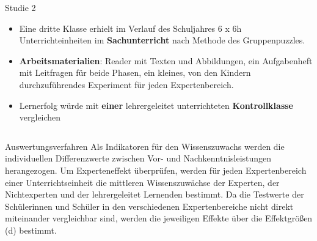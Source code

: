 \documentclass[final]{beamer}
\newlength{\onecolwid}
\newlength{\twocolwid}
\begin{document}
\begin{frame}[t]
\begin{columns}[t]
\begin{column}{\twocolwid}
\begin{columns}[t,totalwidth=\twocolwid]
\begin{column}{\onecolwid}\vspace{-.6in} %
\begin{block}{Studie 2}
\begin{itemize}
\justifying
\item Eine dritte Klasse erhielt im Verlauf des Schuljahres 6 x 6h Unterrichteinheiten im \textbf{Sachunterricht} nach Methode des Gruppenpuzzles. 
\item \textbf{Arbeitsmaterialien}: Reader mit Texten und Abbildungen, ein Aufgabenheft mit Leitfragen für beide Phasen, ein kleines, von den Kindern durchzuführendes  Experiment für jeden Expertenbereich.
\item Lernerfolg würde mit \textbf{einer} lehrergeleitet unterrichteten \textbf{Kontrollklasse} vergleichen
\end{itemize}
\end{block}
\end{column} %
\end{columns} %


\begin{block}{Auswertungsverfahren}
Als Indikatoren für den Wissenszuwachs werden die individuellen Differenzwerte zwischen Vor- und Nachkenntnisleistungen herangezogen. Um Experteneffekt überprüfen, werden für jeden Expertenbereich einer Unterrichtseinheit die mittleren Wissenszuwächse der Experten, der Nichtexperten und der lehrergeleitet Lernenden bestimmt. Da die Testwerte der Schülerinnen und Schüler in den verschiedenen Expertenbereiche nicht direkt miteinander vergleichbar sind, werden die jeweiligen Effekte über die Effektgrößen (d) bestimmt.
\end{block} 



\end{column}
\end{columns}
\end{frame}
\end{document}
